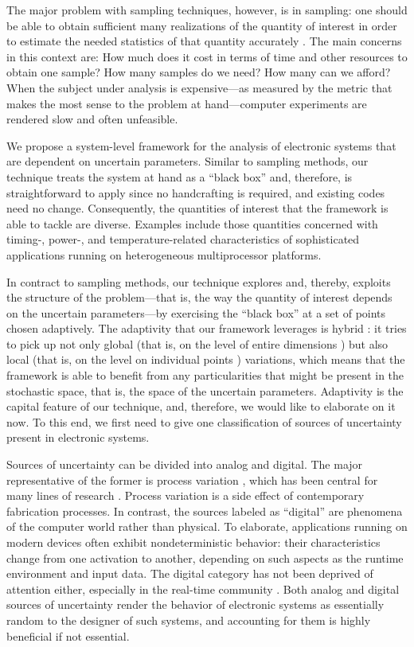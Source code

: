 The major problem with sampling techniques, however, is in sampling: one should
be able to obtain sufficient many realizations of the quantity of interest in
order to estimate the needed statistics of that quantity accurately
\cite{diaz-emparanza2002}. The main concerns in this context are: How much does
it cost in terms of time and other resources to obtain one sample? How many
samples do we need? How many can we afford? When the subject under analysis is
expensive---as measured by the metric that makes the most sense to the problem
at hand---computer experiments are rendered slow and often unfeasible.

We propose a system-level framework for the analysis of electronic systems that
are dependent on uncertain parameters. Similar to sampling methods, our
technique treats the system at hand as a ``black box'' and, therefore, is
straightforward to apply since no handcrafting is required, and existing codes
need no change. Consequently, the quantities of interest that the framework is
able to tackle are diverse. Examples include those quantities concerned with
timing-, power-, and temperature-related characteristics of sophisticated
applications running on heterogeneous multiprocessor platforms.

In contract to sampling methods, our technique explores and, thereby, exploits
the structure of the problem---that is, the way the quantity of interest depends
on the uncertain parameters---by exercising the ``black box'' at a set of points
chosen adaptively. The adaptivity that our framework leverages is hybrid
\cite{jakeman2012}: it tries to pick up not only global (that is, on the level
of entire dimensions \cite{klimke2006}) but also local (that is, on the level on
individual points \cite{ma2009}) variations, which means that the framework is
able to benefit from any particularities that might be present in the stochastic
space, that is, the space of the uncertain parameters. Adaptivity is the capital
feature of our technique, and, therefore, we would like to elaborate on it now.
To this end, we first need to give one classification of sources of uncertainty
present in electronic systems.

Sources of uncertainty can be divided into analog and digital. The major
representative of the former is process variation \cite{srivastava2005}, which
has been central for many lines of research \cite{bhardwaj2008, juan2012,
lee2013, ukhov2014, ukhov2015}. Process variation is a side effect of
contemporary fabrication processes. In contrast, the sources labeled as
``digital'' are phenomena of the computer world rather than physical. To
elaborate, applications running on modern devices often exhibit nondeterministic
behavior: their characteristics change from one activation to another, depending
on such aspects as the runtime environment and input data. The digital category
has not been deprived of attention either, especially in the real-time community
\cite{quinton2012, diaz2002, santinelli2011, yang2013, tanasa2015}. Both analog
and digital sources of uncertainty render the behavior of electronic systems as
essentially random to the designer of such systems, and accounting for them is
highly beneficial if not essential.

